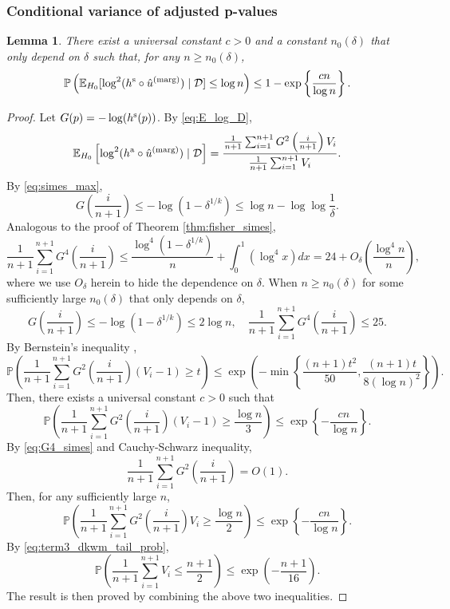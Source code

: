 \documentclass[11pt]{article}
\newtheorem{lemma}{Lemma}
\def\E{\mathbb{E}}
\def\marg{\textnormal{(marg)}}
\def\simes{\textnormal{s}}
\def\asym{\textnormal{a}}
\renewcommand{\P}{\mathbb{P}}
\newcommand{\D}{\mathcal{D}}
\newcommand{\lb}{\left(}
\newcommand{\rb}{\right)}
\begin{document}
\subsubsection{Conditional variance of adjusted p-values}
\begin{lemma}\label{lem:cond_var_simes}
  There exist a universal constant $c > 0$ and a constant $n_0(\delta)$ that only depend on $\delta$ such that, for any $n\ge n_0(\delta)$,
  \begin{equation*}
    \P\lb\E_{H_0}[\log^2 (h^\simes \circ \hat{u}^\marg)\mid \D]\le \log n\rb \le 1 - \exp\left\{ \frac{cn}{\log n}\right\}.
  \end{equation*}
\end{lemma}
\begin{proof}
  Let $G(p) = -\log (h^\simes(p))$. By \eqref{eq:E_log_D},
  \[\E_{H_0}\left[\log^2 (h^\asym \circ \hat{u}^\marg)\mid \D\right] = \frac{\frac{1}{n+1}\sum_{i=1}^{n+1}G^2\left(\frac{i}{n+1}\right)V_{i}}{\frac{1}{n+1}\sum_{i=1}^{n+1}V_{i}}.\]
  By \eqref{eq:simes_max},
  \begin{equation*}
    G\lb\frac{i}{n+1}\rb\le -\log(1 - \delta^{1/k})\le \log n -  \log\log\frac{1}{\delta}.
  \end{equation*}
  Analogous to the proof of Theorem \ref{thm:fisher_simes},
  \begin{equation}
    \label{eq:G4_simes}
    \frac{1}{n+1}\sum_{i=1}^{n+1}G^4\lb\frac{i}{n+1}\rb\le \frac{\log^4(1 - \delta^{1/k})}{n} + \int_{0}^{1}(\log^4 x)dx = 24 + O_{\delta}\lb\frac{\log^4 n}{n}\rb,
  \end{equation}
  where we use $O_{\delta}$ herein to hide the dependence on $\delta$. When $n\ge n_0(\delta)$ for some sufficiently large $n_0(\delta)$ that only depends on $\delta$,
  \begin{equation}
    \label{eq:simes_max_element}
    G\lb\frac{i}{n+1}\rb\le -\log(1 - \delta^{1/k})\le 2\log n, \quad \frac{1}{n+1}\sum_{i=1}^{n+1}G^4\lb\frac{i}{n+1}\rb\le 25.
  \end{equation}
  By Bernstein's inequality \citep[e.g.,][Proposition 2.9]{wainwright2019high},
  \[\P\lb \frac{1}{n+1}\sum_{i=1}^{n+1}G^2\left(\frac{i}{n+1}\right)(V_{i} - 1)\ge t\rb\le \exp\lb-\min\left\{\frac{(n+1)t^2}{50}, \frac{(n+1)t}{8(\log n)^2}\right\}\rb.\]
  Then, there exists a universal constant $c > 0$ such that
  \[\P\lb \frac{1}{n+1}\sum_{i=1}^{n+1}G^2\left(\frac{i}{n+1}\right)(V_{i} - 1)\ge \frac{\log n}{3}\rb\le \exp\left\{-\frac{cn}{\log n}\right\}.\]
  By \eqref{eq:G4_simes} and Cauchy-Schwarz inequality,
  \[\frac{1}{n+1}\sum_{i=1}^{n+1}G^2\lb\frac{i}{n+1}\rb = O(1).\]
  Then, for any sufficiently large $n$,
  \[\P\lb \frac{1}{n+1}\sum_{i=1}^{n+1}G^2\left(\frac{i}{n+1}\right)V_{i}\ge \frac{\log n}{2}\rb\le \exp\left\{-\frac{cn}{\log n}\right\}.\]
  By \eqref{eq:term3_dkwm_tail_prob}, 
  \[\P\lb \frac{1}{n+1}\sum_{i=1}^{n+1}V_i \le \frac{n+1}{2}\rb\le \exp\lb-\frac{n+1}{16}\rb.\]
  The result is then proved by combining the above two inequalities.
\end{proof}
\end{document}
